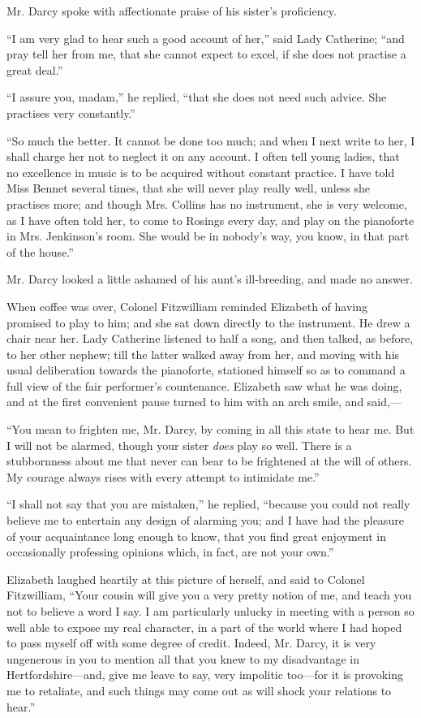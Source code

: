 \documentclass[12pt,openright]{book}
\begin{document}
Mr. Darcy spoke with affectionate praise of his sister’s proficiency.

“I am very glad to hear such a good account of her,” said Lady Catherine; “and pray tell her from me, that she cannot expect to excel, if she does not practise a great deal.”

“I assure you, madam,” he replied, “that she does not need such advice. She practises very constantly.”

“So much the better. It cannot be done too much; and when I next write to her, I shall charge her not to neglect it on any account. I often tell young ladies, that no excellence in music is to be acquired without constant practice. I have told Miss Bennet several times, that she will never play really well, unless she practises more; and though Mrs. Collins has no instrument, she is very welcome, as I have often told her, to come to Rosings every day, and play on the pianoforte in Mrs. Jenkinson’s room. She would be in nobody’s way, you know, in that part of the house.”

Mr. Darcy looked a little ashamed of his aunt’s ill-breeding, and made no answer.

When coffee was over, Colonel Fitzwilliam reminded Elizabeth of having promised to play to him; and she sat down directly to the instrument. He drew a chair near her. Lady Catherine listened to half a song, and then talked, as before, to her other nephew; till the latter walked away from her, and moving with his usual deliberation towards the pianoforte, stationed himself so as to command a full view of the fair performer’s countenance. Elizabeth saw what he was doing, and at the first convenient pause turned to him with an arch smile, and said,—

“You mean to frighten me, Mr. Darcy, by coming in all this state to hear me. But I will not be alarmed, though your sister \textit{does} play so well. There is a stubbornness about me that never can bear to be frightened at the will of others. My courage always rises with every attempt to intimidate me.”

“I shall not say that you are mistaken,” he replied, “because you could not really believe me to entertain any design of alarming you; and I have had the pleasure of your acquaintance long enough to know, that you find great enjoyment in occasionally professing opinions which, in fact, are not your own.”

Elizabeth laughed heartily at this picture of herself, and said to Colonel Fitzwilliam, “Your cousin will give you a very pretty notion of me, and teach you not to believe a word I say. I am particularly unlucky in meeting with a person so well able to expose my real character, in a part of the world where I had hoped to pass myself off with some degree of credit. Indeed, Mr. Darcy, it is very ungenerous in you to mention all that you knew to my disadvantage in Hertfordshire—and, give me leave to say, very impolitic too—for it is provoking me to retaliate, and such things may come out as will shock your relations to hear.”
\end{document}
